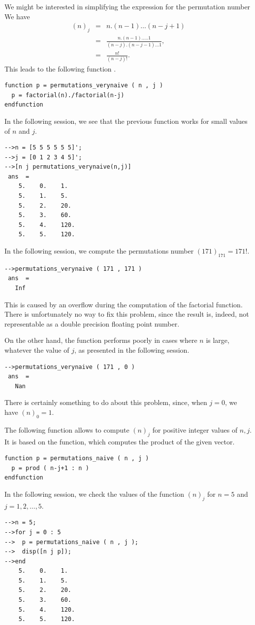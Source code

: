 We might be interested in simplifying the 
expression for the permutation number
We have 
\begin{eqnarray}
(n)_j &=& n . (n-1) \ldots (n-j+1) \\
&=& \frac{n . (n-1) . \ldots . 1}{(n-j).(n-j-1)\ldots 1},\\
&=&\frac{n!}{(n-j)!}. \label{sec-computeperm1}
\end{eqnarray}
This leads to the following function .
\lstset{language=scilabscript}
\begin{lstlisting}
function p = permutations_verynaive ( n , j )
  p = factorial(n)./factorial(n-j)
endfunction
\end{lstlisting}
In the following session, we see that the previous function 
works for small values of $n$ and $j$.
\lstset{language=scilabscript}
\begin{lstlisting}
-->n = [5 5 5 5 5 5]';
-->j = [0 1 2 3 4 5]';
-->[n j permutations_verynaive(n,j)]
 ans  =
    5.    0.    1.    
    5.    1.    5.    
    5.    2.    20.   
    5.    3.    60.   
    5.    4.    120.  
    5.    5.    120.  
\end{lstlisting}
In the following session, we compute the permutations number 
$(171)_{171} = 171!$. 
\lstset{language=scilabscript}
\begin{lstlisting}
-->permutations_verynaive ( 171 , 171 )
 ans  =
   Inf  
\end{lstlisting}
This is caused by an overflow during the computation of 
the factorial function. There is unfortunately no way 
to fix this problem, since the result is, indeed, not 
representable as a double precision floating point number.

On the other hand, the  function 
performs poorly in cases where $n$ is large, whatever the value of 
$j$, as presented in the following session.
\lstset{language=scilabscript}
\begin{lstlisting}
-->permutations_verynaive ( 171 , 0 )
 ans  =
   Nan  
\end{lstlisting}
There is certainly something to do about this problem, since,
when $j=0$, we have $(n)_0=1$. 

The following  function allows to compute $(n)_j$ for 
positive integer values of $n,j$.
It is based on the  function, which computes the 
product of the given vector.
\lstset{language=scilabscript}
\begin{lstlisting}
function p = permutations_naive ( n , j )
  p = prod ( n-j+1 : n )
endfunction
\end{lstlisting}
In the following session, we check the values of the 
function $(n)_j$ for $n=5$ and $j=1,2,\ldots,5$.
\lstset{language=scilabscript}
\begin{lstlisting}
-->n = 5;
-->for j = 0 : 5
-->  p = permutations_naive ( n , j );
-->  disp([n j p]);
-->end
    5.    0.    1.  
    5.    1.    5.  
    5.    2.    20.  
    5.    3.    60.  
    5.    4.    120.  
    5.    5.    120.  
\end{lstlisting}

